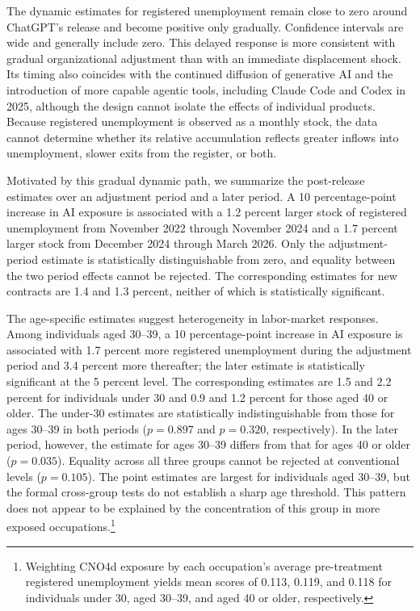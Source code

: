 The dynamic estimates for registered unemployment remain close to zero around ChatGPT's release and become positive only gradually. Confidence intervals are wide and generally include zero. This delayed response is more consistent with gradual organizational adjustment than with an immediate displacement shock. Its timing also coincides with the continued diffusion of generative AI and the introduction of more capable agentic tools, including Claude Code and Codex in 2025, although the design cannot isolate the effects of individual products. Because registered unemployment is observed as a monthly stock, the data cannot determine whether its relative accumulation reflects greater inflows into unemployment, slower exits from the register, or both.

Motivated by this gradual dynamic path, we summarize the post-release estimates over an adjustment period and a later period. A 10 percentage-point increase in AI exposure is associated with a 1.2 percent larger stock of registered unemployment from November 2022 through November 2024 and a 1.7 percent larger stock from December 2024 through March 2026. Only the adjustment-period estimate is statistically distinguishable from zero, and equality between the two period effects cannot be rejected. The corresponding estimates for new contracts are 1.4 and 1.3 percent, neither of which is statistically significant.

The age-specific estimates suggest heterogeneity in labor-market responses. Among individuals aged 30--39, a 10 percentage-point increase in AI exposure is associated with 1.7 percent more registered unemployment during the adjustment period and 3.4 percent more thereafter; the later estimate is statistically significant at the 5 percent level. The corresponding estimates are 1.5 and 2.2 percent for individuals under 30 and 0.9 and 1.2 percent for those aged 40 or older. The under-30 estimates are statistically indistinguishable from those for ages 30--39 in both periods (\(p=0.897\) and \(p=0.320\), respectively). In the later period, however, the estimate for ages 30--39 differs from that for ages 40 or older (\(p=0.035\)). Equality across all three groups cannot be rejected at conventional levels (\(p=0.105\)). The point estimates are largest for individuals aged 30–39, but the formal cross-group tests do not establish a sharp age threshold. This pattern does not appear to be explained by the concentration of this group in more exposed occupations.\footnote{Weighting CNO4d exposure by each occupation's average pre-treatment registered unemployment yields mean scores of 0.113, 0.119, and 0.118 for individuals under 30, aged 30--39, and aged 40 or older, respectively.}

